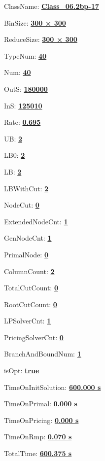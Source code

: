 \documentclass[11pt]{article}
\begin{document}
\pagestyle{empty}


ClassName: \underline{\textbf{Class_06.2bp-17}}
\par
BinSize: \underline{\textbf{300 × 300}}
\par
ReduceSize: \underline{\textbf{300 × 300}}
\par
TypeNum: \underline{\textbf{40}}
\par
Num: \underline{\textbf{40}}
\par
OutS: \underline{\textbf{180000}}
\par
InS: \underline{\textbf{125010}}
\par
Rate: \underline{\textbf{0.695}}
\par
UB: \underline{\textbf{2}}
\par
LB0: \underline{\textbf{2}}
\par
LB: \underline{\textbf{2}}
\par
LBWithCut: \underline{\textbf{2}}
\par
NodeCut: \underline{\textbf{0}}
\par
ExtendedNodeCnt: \underline{\textbf{1}}
\par
GenNodeCnt: \underline{\textbf{1}}
\par
PrimalNode: \underline{\textbf{0}}
\par
ColumnCount: \underline{\textbf{2}}
\par
TotalCutCount: \underline{\textbf{0}}
\par
RootCutCount: \underline{\textbf{0}}
\par
LPSolverCnt: \underline{\textbf{1}}
\par
PricingSolverCnt: \underline{\textbf{0}}
\par
BranchAndBoundNum: \underline{\textbf{1}}
\par
isOpt: \underline{\textbf{true}}
\par
TimeOnInitSolution: \underline{\textbf{600.000 s}}
\par
TimeOnPrimal: \underline{\textbf{0.000 s}}
\par
TimeOnPricing: \underline{\textbf{0.000 s}}
\par
TimeOnRmp: \underline{\textbf{0.070 s}}
\par
TotalTime: \underline{\textbf{600.375 s}}
\par
\newpage
\end{document}
